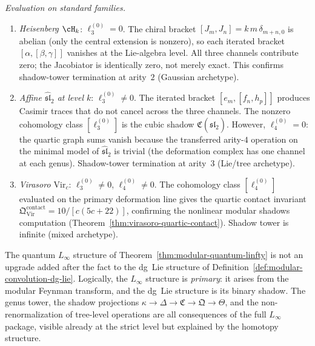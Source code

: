 \begin{construction}
\emph{Evaluation on standard families.}
\begin{enumerate}[label=\textup{(\alph*)}]
\item \emph{Heisenberg $\cH_k$}: $\ell_3^{(0)} = 0$.
  The chiral bracket $[J_m, J_n] = k\,m\,\delta_{m+n,0}$ is
  abelian (only the central extension is nonzero), so each
  iterated bracket $[\alpha, [\beta, \gamma]]$ vanishes at the
  Lie-algebra level.  All three channels contribute zero; the
  Jacobiator is identically zero, not merely exact.  This confirms
  shadow-tower termination at arity~$2$ (Gaussian archetype).
\item \emph{Affine $\widehat{\mathfrak{sl}}_2$ at level $k$}:
  $\ell_3^{(0)} \neq 0$.
  The iterated bracket $[e_m, [f_n, h_p]]$ produces Casimir traces
  that do not cancel across the three channels.  The nonzero
  cohomology class $[\ell_3^{(0)}]$ is the cubic shadow
  $\mathfrak{C}(\widehat{\mathfrak{sl}}_2)$.
  However, $\ell_4^{(0)} = 0$: the quartic graph sums vanish
  because the transferred arity-$4$ operation on the minimal model
  of $\widehat{\mathfrak{sl}}_2$ is trivial (the deformation
  complex has one channel at each genus).  Shadow-tower termination
  at arity~$3$ (Lie/tree archetype).
\item \emph{Virasoro $\mathrm{Vir}_c$}: $\ell_3^{(0)} \neq 0$,
  $\ell_4^{(0)} \neq 0$.  The cohomology class
  $[\ell_4^{(0)}]$ evaluated on the primary deformation line gives
  the quartic contact invariant
  $\mathfrak{Q}^{\mathrm{contact}}_{\mathrm{Vir}}
  = 10/[c(5c+22)]$, confirming the nonlinear modular shadows
  computation
  (Theorem~\ref{thm:virasoro-quartic-contact}).
  Shadow tower is infinite (mixed archetype).
\end{enumerate}
\end{construction}

\begin{remark}
\label{rem:linfty-logical-priority}
The quantum $L_\infty$ structure of
Theorem~\ref{thm:modular-quantum-linfty} is not an upgrade added
after the fact to the dg~Lie structure of
Definition~\ref{def:modular-convolution-dg-lie}.  Logically, the
$L_\infty$ structure is \emph{primary}: it arises from the modular
Feynman transform, and the dg~Lie structure is its binary shadow.
The genus tower, the shadow projections
$\kappa \to \Delta \to \mathfrak{C} \to \mathfrak{Q} \to \Theta$,
and the non-renormalization of tree-level operations are all
consequences of the full $L_\infty$ package, visible already at the
strict level but explained by the homotopy structure.
\end{remark}

